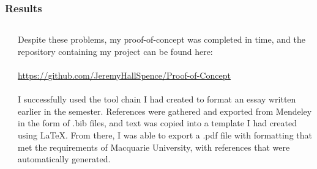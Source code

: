 \documentclass[aspectratio = 169]{beamer}
\begin{document}
\begin{frame}
\label{results}
\frametitle{Results}
\begin{columns}


\hyperlink{introI}{} \newline
\hyperlink{introII}{} \newline 
\hyperlink{scoping}{} \newline
\hyperlink{elaboration}{} \newline  
\hyperlink{software}{} \newline 
\hyperlink{toolchain}{} \newline 
\hyperlink{learning}{} \newline 
\hyperlink{problems}{} \newline 
\hyperlink{results}{} \newline
\hyperlink{exampleI}{} \newline 
\hyperlink{exampleII}{}  



Despite these problems, my proof-of-concept was completed in time, and the repository containing my project can be found here: \\~\\ \href{https://github.com/JeremyHallSpence/Proof-of-Concept}{\underline{https://github.com/JeremyHallSpence/Proof-of-Concept}}
\\~\\
I successfully used the tool chain I had created to format an essay written earlier in the semester. References were gathered and exported from Mendeley in the form of .bib files, and text was copied into a template I had created using LaTeX. From there, I was able to export a .pdf file with formatting that met the requirements of Macquarie University, with references that were automatically generated.

\end{columns}
\end{frame}



\end{document}
